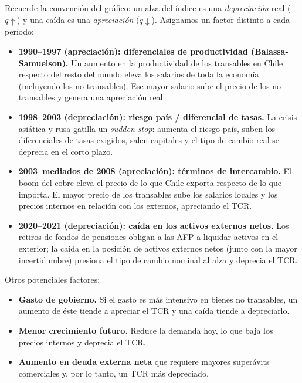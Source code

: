 \documentclass[a4paper]{article}
\begin{document}
\begin{enumerate}
    \begin{solution}
        Recuerde la convención del gráfico: un alza del índice es una \emph{depreciación} real ($q\uparrow$) y una caída es una \emph{apreciación} ($q\downarrow$). Asignamos un factor distinto a cada período:
        \begin{itemize}
            \item \textbf{1990--1997 (apreciación): diferenciales de productividad (Balassa-Samuelson).} Un aumento en la productividad de los transables en Chile respecto del resto del mundo eleva los salarios de toda la economía (incluyendo los no transables). Ese mayor salario sube el precio de los no transables y genera una apreciación real.
            \item \textbf{1998--2003 (depreciación): riesgo país / diferencial de tasas.} La crisis asiática y rusa gatilla un \emph{sudden stop}: aumenta el riesgo país, suben los diferenciales de tasas exigidos, salen capitales y el tipo de cambio real se deprecia en el corto plazo.
            \item \textbf{2003--mediados de 2008 (apreciación): términos de intercambio.} El boom del cobre eleva el precio de lo que Chile exporta respecto de lo que importa. El mayor precio de los transables sube los salarios locales y los precios internos en relación con los externos, apreciando el TCR.
            \item \textbf{2020--2021 (depreciación): caída en los activos externos netos.} Los retiros de fondos de pensiones obligan a las AFP a liquidar activos en el exterior; la caída en la posición de activos externos netos (junto con la mayor incertidumbre) presiona el tipo de cambio nominal al alza y deprecia el TCR.
        \end{itemize}

        Otros potenciales factores:
        \begin{itemize}
            \item \textbf{Gasto de gobierno.} Si el gasto es más intensivo en bienes no transables, un aumento de éste tiende a apreciar el TCR y una caída tiende a depreciarlo.
            \item \textbf{Menor crecimiento futuro.} Reduce la demanda hoy, lo que baja los precios internos y deprecia el TCR.
            \item \textbf{Aumento en deuda externa neta} que requiere mayores superávits comerciales y, por lo tanto, un TCR más depreciado.
        \end{itemize}
    \end{solution}


\end{enumerate}
\end{document}
